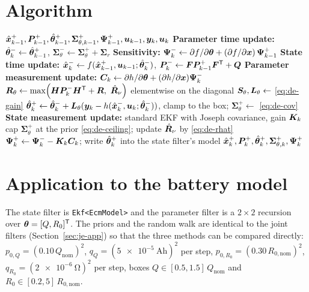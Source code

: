 \section{Algorithm}
\begin{algorithm}[H]
\caption{Dual EKF --- one sampling period}
\begin{algorithmic}[1]
\Require $\hat{\bm{x}}^{+}_{k-1},\bm{P}^+_{k-1},\hat{\bm{\theta}}^+_{k-1},\bm{\Sigma}^+_{\theta,k-1},\bm{\Psi}^+_{k-1},\bm{u}_{k-1},\bm{y}_k,\bm{u}_k$
\State \textbf{Parameter time update:} $\hat{\bm{\theta}}^-_k\gets\hat{\bm{\theta}}^+_{k-1}$, $\bm{\Sigma}^-_\theta\gets\bm{\Sigma}^+_\theta+\bm{\Sigma}_r$
\State \textbf{Sensitivity:} $\bm{\Psi}^-_k\gets\partial f/\partial\bm{\theta}+(\partial f/\partial\bm{x})\,\bm{\Psi}^+_{k-1}$ 
\State \textbf{State time update:} $\hat{\bm{x}}^{-}_k\gets f(\hat{\bm{x}}^{+}_{k-1},\bm{u}_{k-1};\hat{\bm{\theta}}^-_k)$, $\bm{P}^-_k\gets\bm{F}\bm{P}^+_{k-1}\bm{F}^{\mathsf{T}}+\bm{Q}$
\State \textbf{Parameter measurement update:} $\bm{C}_k\gets\partial h/\partial\bm{\theta}+(\partial h/\partial\bm{x})\bm{\Psi}^-_k$
\State $\mR_\theta\gets\max\!\left(\mH\mP^-_k\mH^\T+\mR,\ \hat{\mR}_\nu\right)$ elementwise on the diagonal 
\State $\bm{S}_\theta,\bm{L}_\theta\gets$ \eqref{eq:de-gain}
\State $\hat{\bm{\theta}}^+_k\gets\hat{\bm{\theta}}^-_k+\bm{L}_\theta(\bm{y}_k-h(\hat{\bm{x}}^{-}_k,\bm{u}_k;\hat{\bm{\theta}}^-_k))$, clamp to the box; $\bm{\Sigma}^+_\theta\gets$ \eqref{eq:de-cov}
\State \textbf{State measurement update:} standard EKF with Joseph covariance, gain $\bm{K}_k$
\State cap $\bm{\Sigma}^+_\theta$ at the prior \eqref{eq:de-ceiling}; update $\hat{\bm{R}}_\nu$ by \eqref{eq:de-rhat}
\State $\bm{\Psi}^+_k\gets\bm{\Psi}^-_k-\bm{K}_k\bm{C}_k$; write $\hat{\bm{\theta}}^+_k$ into the state filter's model
\Ensure $\hat{\bm{x}}^{+}_k,\bm{P}^+_k,\hat{\bm{\theta}}^+_k,\bm{\Sigma}^+_{\theta,k},\bm{\Psi}^+_k$
\end{algorithmic}
\end{algorithm}

\section{Application to the battery model}
The state filter is \texttt{Ekf<EcmModel>} and the parameter filter is a $2\times2$ recursion over
$\bm{\theta}=[Q,R_0]^{\mathsf{T}}$.  The priors and the random walk are identical to the joint filters
(Section~\ref{sec:je-app}) so that the three methods can be compared directly:
$p_{0,Q}=(0.10\,Q_\text{nom})^2$, $q_Q=(\SI{5e-5}{\ampere\hour})^2$ per step,
$p_{0,R_0}=(0.30\,R_{0,\text{nom}})^2$, $q_{R_0}=(\SI{2e-6}{\ohm})^2$ per step, boxes
$Q\in[0.5,1.5]\,Q_\text{nom}$ and $R_0\in[0.2,5]\,R_{0,\text{nom}}$.


